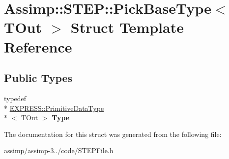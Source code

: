\hypertarget{struct_assimp_1_1_s_t_e_p_1_1_pick_base_type}{\section{Assimp\+:\+:S\+T\+E\+P\+:\+:Pick\+Base\+Type$<$ T\+Out $>$ Struct Template Reference}
\label{struct_assimp_1_1_s_t_e_p_1_1_pick_base_type}
}
\subsection*{Public Types}
\begin{DoxyCompactItemize}
\item 
\hypertarget{struct_assimp_1_1_s_t_e_p_1_1_pick_base_type_a8aebf20d9fdf53f36ca89c16c5e7be78}{typedef \\*
\hyperlink{class_assimp_1_1_s_t_e_p_1_1_e_x_p_r_e_s_s_1_1_primitive_data_type}{E\+X\+P\+R\+E\+S\+S\+::\+Primitive\+Data\+Type}\\*
$<$ T\+Out $>$ {\bfseries Type}}\label{struct_assimp_1_1_s_t_e_p_1_1_pick_base_type_a8aebf20d9fdf53f36ca89c16c5e7be78}

\end{DoxyCompactItemize}


The documentation for this struct was generated from the following file\+:\begin{DoxyCompactItemize}
\item 
assimp/assimp-\/3../code/S\+T\+E\+P\+File.\+h\end{DoxyCompactItemize}
